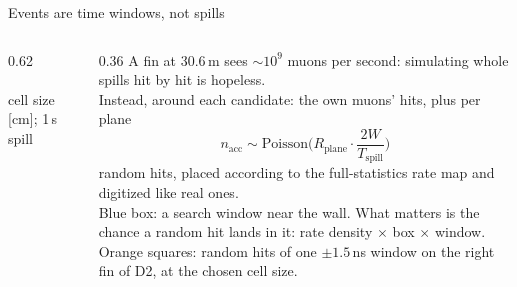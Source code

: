 \documentclass[aspectratio=169,10pt]{beamer}
\newcommand{\sld}[2][\linewidth]{\livewidget{#2}{#1}{0.62cm}}
\newcommand{\legendline}[1]{{\color{muted}\lightfont\scriptsize #1}}
\begin{document}
\begin{frame}{Events are time windows, not spills}
  \begin{columns}[c]
    \begin{column}{0.62\textwidth}
      \\[1mm]
      \sld[0.6\linewidth]{cell_cm}\\[0.3mm]
      \legendline{cell size [cm]; 1\,s spill}
    \end{column}
    \begin{column}{0.36\textwidth}\footnotesize
      A fin at 30.6\,m sees $\sim10^{9}$ muons per second: simulating whole spills hit by hit is hopeless.\\[1.5mm]
      Instead, around each candidate: the own muons' hits, plus per plane
      \[ n_\text{acc} \sim \text{Poisson}\Big(R_\text{plane}\cdot\frac{2W}{T_\text{spill}}\Big) \]
      random hits, placed according to the full-statistics rate map and digitized like real ones.\\[1.5mm]
      Blue box: a search window near the wall. What matters is the chance a random hit lands in it: rate density $\times$ box $\times$ window.\\[1.5mm]
      \legendline{Orange squares: random hits of one $\pm1.5$\,ns window on the right fin of D2, at the chosen cell size.}
    \end{column}
  \end{columns}
\end{frame}
\end{document}
